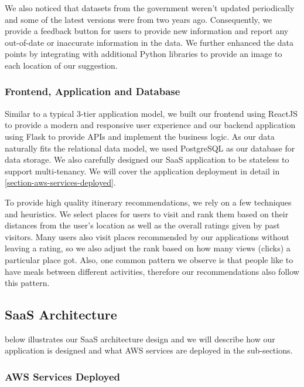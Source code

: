 \documentclass[12pt,a4paper]{article}
\begin{document}
        We also noticed that datasets from the government weren’t updated periodically and some of the latest versions were from two years ago. Consequently, we provide a feedback button for users to provide new information and report any out-of-date or inaccurate information in the data. We further enhanced the data points by integrating with additional Python libraries to provide an image to each location of our suggestion.

        
        \subsubsection{Frontend, Application and Database}
        
        Similar to a typical 3-tier application model, we built our frontend using ReactJS to provide a modern and responsive user experience and our backend application using Flask to provide APIs and implement the business logic. As our data naturally fits the relational data model, we used PostgreSQL as our database for data storage. We also carefully designed our SaaS application to be stateless to support multi-tenancy. We will cover the application deployment in detail in \autoref{section-aws-services-deployed}.

        To provide high quality itinerary recommendations, we rely on a few techniques and heuristics. We select places for users to visit and rank them based on their distances from the user’s location as well as the overall ratings given by past visitors. Many users also visit places recommended by our applications without leaving a rating, so we also adjust the rank based on how many views (clicks) a particular place got. Also, one common pattern we observe is that people like to have meals between different activities, therefore our recommendations also follow this pattern.

    \subsection{SaaS Architecture}
     below illustrates our SaaS architecture design and we will describe how our application is designed and what AWS services are deployed in the sub-sections.
    
    
        \label{section-aws-services-deployed}
        \subsubsection{AWS Services Deployed}
        
\end{document}
